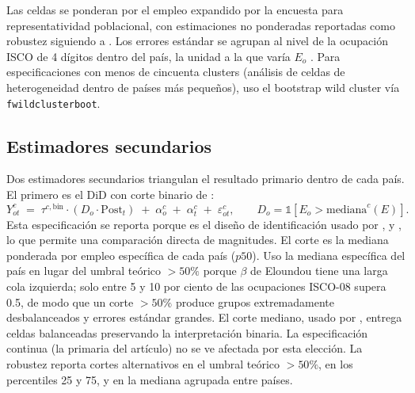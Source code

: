 Las celdas se ponderan por el empleo expandido por la encuesta para representatividad poblacional, con estimaciones no ponderadas reportadas como robustez siguiendo a \citet{SolonHW2015_weight}. Los errores estándar se agrupan al nivel de la ocupación ISCO de 4 dígitos dentro del país, la unidad a la que varía $E_o$ \citep{AbadieAIW2023_cluster}. Para especificaciones con menos de cincuenta clusters (análisis de celdas de heterogeneidad dentro de países más pequeños), uso el bootstrap wild cluster vía \texttt{fwildclusterboot}.

\subsection{Estimadores secundarios}
\label{subsec:method_secondary}

Dos estimadores secundarios triangulan el resultado primario dentro de cada país. El primero es el DiD con corte binario de \citet{CallawayS2021_did}:
\begin{equation}
Y_{ot}^c \;=\; \tau^{c,\text{bin}} \cdot (D_o \cdot \text{Post}_t) \;+\; \alpha_{o}^c \;+\; \alpha_{t}^c \;+\; \varepsilon_{ot}^c,\qquad D_o = \mathbb{1}[E_o > \text{mediana}^c(E)].
\label{eq:did_binary}
\end{equation}
Esta especificación se reporta porque es el diseño de identificación usado por \citet{Hartley2024_labor_effects}, \citet{Hui2024_online_labor} y \citet{Liu2025_generate_future}, lo que permite una comparación directa de magnitudes. El corte es la mediana ponderada por empleo específica de cada país ($p50$). Uso la mediana específica del país en lugar del umbral teórico $>50\%$ porque $\beta$ de Eloundou tiene una larga cola izquierda; solo entre 5 y 10 por ciento de las ocupaciones ISCO-08 supera 0.5, de modo que un corte $>50\%$ produce grupos extremadamente desbalanceados y errores estándar grandes. El corte mediano, usado por \citet{Liu2025_generate_future}, entrega celdas balanceadas preservando la interpretación binaria. La especificación continua (la primaria del artículo) no se ve afectada por esta elección. La robustez reporta cortes alternativos en el umbral teórico $>50\%$, en los percentiles 25 y 75, y en la mediana agrupada entre países.


